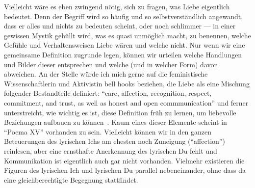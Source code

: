 Vielleicht wäre es eben zwingend nötig, sich zu fragen, was Liebe eigentlich bedeutet.
Denn der Begriff wird so häufig und so selbstverständlich angewandt, dass er alles und nichts zu bedeuten scheint, oder noch schlimmer — in einer gewissen Mystik gehüllt wird, was es quasi unmöglich macht, zu benennen, welche Gefühle und Verhaltensweisen Liebe wären und welche nicht.
Nur wenn wir eine gemeinsame Definition zugrunde legen, können wir urteilen welche Handlungen und Bilder dieser entsprechen und welche (und in welcher Form) davon abweichen.
An der Stelle würde ich mich gerne auf die feministische Wissenschaftlerin und Aktivistin bell hooks beziehen, die Liebe als eine Mischung folgender Bestandteile definiert: ``care, affection, recognition, respect, commitment, and trust, as well as honest and open commmunication''
und ferner unterstreicht, wie wichtig es ist, diese Definition früh zu lernen, um liebevolle Beziehungen aufbauen zu können~\cite{hooks2001}.
Kaum eines dieser Elemente scheint in ``Poema XV'' vorhanden zu sein.
Vielleicht können wir in den ganzen Beteuerungen des lyrischen Ichs am ehesten noch Zuneigung (``affection'') reinlesen, aber eine ernsthafte Anerkennung des lyrischen Du fehlt und Kommunikation ist eigentlich auch gar nicht vorhanden.
Vielmehr existieren die Figuren des lyrischen Ich und lyrischen Du parallel nebeneinander, ohne dass da eine gleichberechtigte Begegnung stattfindet.

